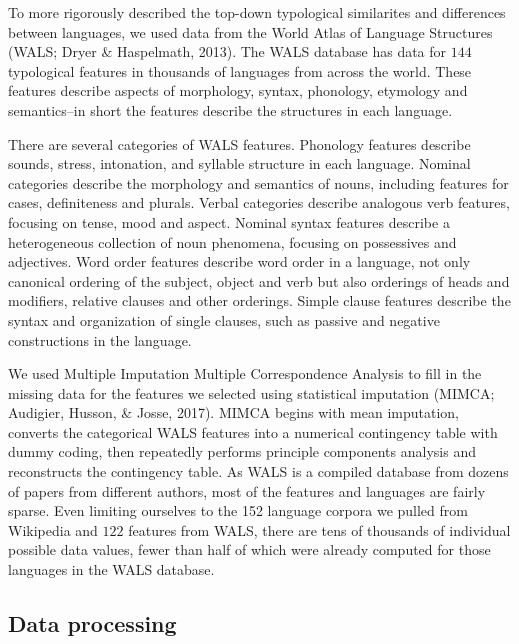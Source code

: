 \documentclass[man,floatsintext]{apa6}
\begin{document}
To more rigorously described the top-down typological similarites and differences between languages, we used data from the World Atlas of Language Structures (WALS; Dryer \& Haspelmath, 2013). The WALS database has data for \(144\) typological features in thousands of languages from across the world. These features describe aspects of morphology, syntax, phonology, etymology and semantics--in short the features describe the structures in each language.

There are several categories of WALS features. Phonology features describe sounds, stress, intonation, and syllable structure in each language. Nominal categories describe the morphology and semantics of nouns, including features for cases, definiteness and plurals. Verbal categories describe analogous verb features, focusing on tense, mood and aspect. Nominal syntax features describe a heterogeneous collection of noun phenomena, focusing on possessives and adjectives. Word order features describe word order in a language, not only canonical ordering of the subject, object and verb but also orderings of heads and modifiers, relative clauses and other orderings. Simple clause features describe the syntax and organization of single clauses, such as passive and negative constructions in the language.

We used Multiple Imputation Multiple Correspondence Analysis to fill in the missing data for the features we selected using statistical imputation (MIMCA; Audigier, Husson, \& Josse, 2017). MIMCA begins with mean imputation, converts the categorical WALS features into a numerical contingency table with dummy coding, then repeatedly performs principle components analysis and reconstructs the contingency table. As WALS is a compiled database from dozens of papers from different authors, most of the features and languages are fairly sparse. Even limiting ourselves to the 152 language corpora we pulled from Wikipedia and \(122\) features from WALS, there are tens of thousands of individual possible data values, fewer than half of which were already computed for those languages in the WALS database.

\hypertarget{data-processing-1}{%
\subsection{Data processing}\label{data-processing-1}}
\end{document}
